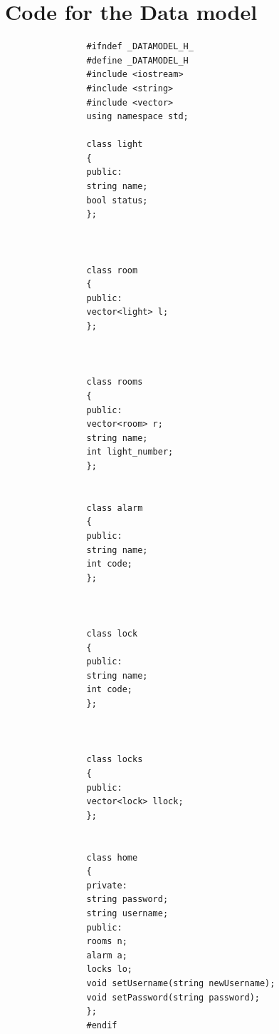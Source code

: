 \documentclass[11pt]{article}
\begin{document}
	\section{Code for the Data model}
			\begin{lstlisting}
				#ifndef _DATAMODEL_H_
				#define _DATAMODEL_H
				#include <iostream>
				#include <string>
				#include <vector>
				using namespace std;
				
				class light
				{
				public:
				string name;
				bool status;
				};
				
				
				
				class room
				{
				public:
				vector<light> l;
				};
				
				
				
				class rooms
				{
				public:
				vector<room> r;
				string name;
				int light_number;
				};
				
				
				class alarm
				{
				public:
				string name;
				int code;
				};
				
				
				
				class lock
				{
				public:
				string name;
				int code;
				};
				
				
				
				class locks
				{
				public:
				vector<lock> llock;
				};
				
				
				class home
				{
				private:
				string password;
				string username;
				public:
				rooms n;
				alarm a;
				locks lo;
				void setUsername(string newUsername);
				void setPassword(string password);
				};
				#endif
			\end{lstlisting}
\end{document}
